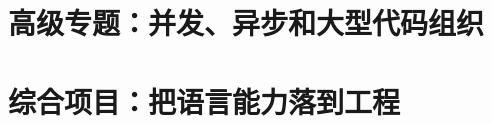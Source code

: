 \documentclass[UTF8,openany,zihao=5,fontset=none]{ctexbook}
\begin{document}
\part{高级专题：并发、异步和大型代码组织}







\part{综合项目：把语言能力落到工程}








\appendix






\backmatter

\printindex
\end{document}

